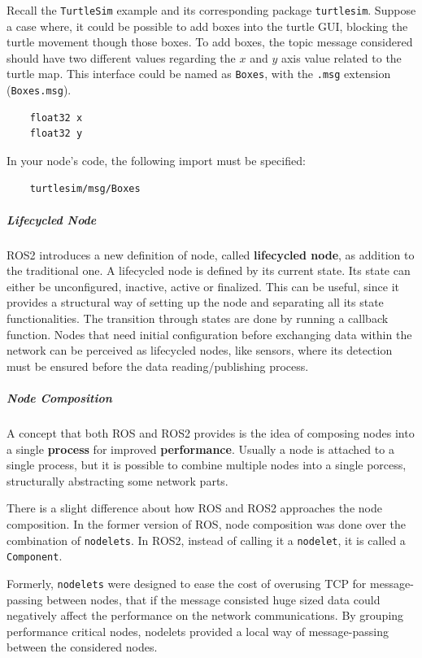 Recall the \texttt{TurtleSim} example and its corresponding package \texttt{turtlesim}. Suppose a case where, it could be possible to add boxes into the turtle GUI, blocking the turtle movement though those boxes. To add boxes, the topic message considered should have two different values regarding the $x$ and $y$ axis value related to the turtle map. This interface could be named as \texttt{Boxes}, with the \texttt{.msg} extension (\texttt{Boxes.msg}).
               
\begin{verbatim}
    float32 x
    float32 y
\end{verbatim}

In your node's code, the following import must be specified:

\begin{verbatim}
    turtlesim/msg/Boxes
\end{verbatim}
               
\subparagraph{Lifecycled Node}
               
ROS2 introduces a new definition of node, called \textbf{lifecycled node}, as addition to the traditional one. A lifecycled node is defined by its current state. Its state can either be unconfigured, inactive, active or finalized. This can be useful, since it provides a structural way of setting up the node and separating all its state functionalities. The transition through states are done by running a callback function. Nodes that need initial configuration before exchanging data within the network can be perceived as lifecycled nodes, like sensors, where its detection must be ensured before the data reading/publishing process. 
               
\subparagraph{Node Composition}
               
A concept that both ROS and ROS2 provides is the idea of composing nodes into a single \textbf{process} for improved \textbf{performance}. Usually a node is attached to a single process, but it is possible to combine multiple nodes into a single porcess, structurally abstracting some network parts. 

There is a slight difference about how ROS and ROS2 approaches the node composition. In the former version of ROS, node composition was done over the combination of \texttt{nodelets}. In ROS2, instead of calling it a \texttt{nodelet}, it is called a \texttt{Component}. 

Formerly, \texttt{nodelets} were designed to ease the cost of overusing TCP for message-passing between nodes, that if the message consisted huge sized data could negatively affect the performance on the network communications. By grouping performance critical nodes, nodelets provided a local way of message-passing between the considered nodes.

